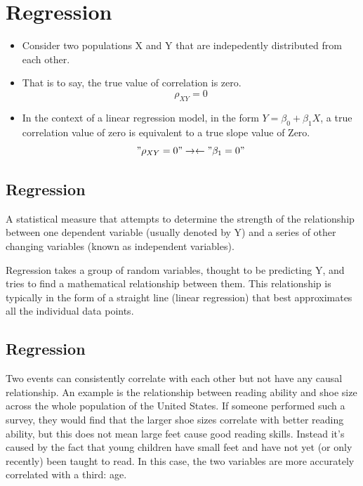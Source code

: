 \documentclass[]{report}
\begin{document}
					\section{Regression}
					
					\begin{itemize}
						\item Consider two populations X and Y that are indepedently distributed from
						each other.
						\item That is to say, the true value of correlation is zero.
						\[\rho_{XY} = 0 \]
						\item In the context of a linear regression model, in the form $Y=\beta_0  +  \beta_1X$, a true correlation value of zero is equivalent to a true slope value of Zero.
						\["\rho_{XY} = 0" \rightarrow\leftarrow "\beta_1=0"\]
					\end{itemize}
					

					

\subsection{Regression}
A statistical measure that attempts to determine the strength of the relationship between one dependent variable 
(usually denoted by Y) and a series of other changing variables (known as independent variables).

Regression takes a group of random variables, thought to be predicting Y, and tries to find a mathematical relationship between them. This relationship is typically in the form of a straight line (linear regression) that best approximates all the individual data points.




\subsection{Regression}

Two events can consistently correlate with each other but not have any causal relationship. 
An example is the relationship between reading ability and shoe size across the whole population of the United States. 
If someone performed such a survey, they would find that the larger shoe sizes correlate with better reading ability, but 
this does not mean large feet cause good reading skills. Instead it's caused by the fact that young children have small 
feet and have not yet (or only recently) been taught to read. In this case, the two variables are more accurately correlated with a third: age.
\end{document}

